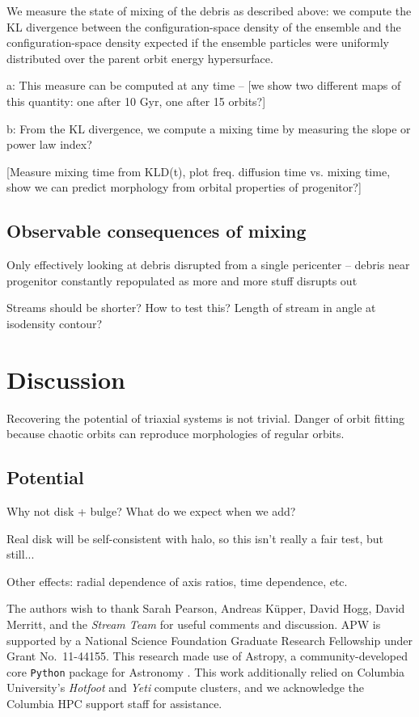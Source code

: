 \documentclass[letterpaper,12pt,preprint]{aastex}
\begin{document}
We measure the state of mixing of the debris as described above: we compute the KL divergence between the configuration-space density of the ensemble and the configuration-space density expected if the ensemble particles were uniformly distributed over the parent orbit energy hypersurface. 

a:
This measure can be computed at any time -- [we show two different maps of this quantity: one after 10 Gyr, one after 15 orbits?]

b: 
From the KL divergence, we compute a mixing time by measuring the slope or power law index?

[Measure mixing time from KLD(t), plot freq. diffusion time vs. mixing time, show we can predict morphology from orbital properties of progenitor?]

\subsection{Observable consequences of mixing}

Only effectively looking at debris disrupted from a single pericenter -- debris near progenitor constantly repopulated as more and more stuff disrupts out

Streams should be shorter? How to test this? Length of stream in angle at isodensity contour?

\section{Discussion}\label{sec:discussion}

Recovering the potential of triaxial systems is not trivial. Danger of orbit fitting because chaotic orbits can reproduce morphologies of regular orbits.

\subsection{Potential}

Why not disk + bulge? What do we expect when we add?

Real disk will be self-consistent with halo, so this isn't really a fair test, but still...

Other effects: radial dependence of axis ratios, time dependence, etc.

\acknowledgements
The authors wish to thank Sarah Pearson, Andreas K\"upper, David Hogg, David Merritt, and the \emph{Stream Team} for useful comments and discussion.
APW is supported by a National Science Foundation Graduate Research Fellowship under Grant No.\ 11-44155. 
This research made use of Astropy, a community-developed core \texttt{Python} package for Astronomy \citep{astropy13}.
This work additionally relied on Columbia University's \emph{Hotfoot} and \emph{Yeti} compute clusters, and we acknowledge the Columbia HPC support staff for assistance.



\end{document}
